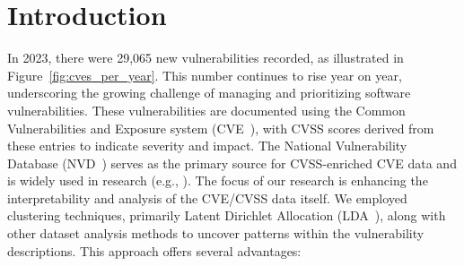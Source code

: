 \section{Introduction}

In 2023, there were 29,065 new vulnerabilities recorded, as illustrated in
Figure~\ref{fig:cves_per_year}. This number continues to rise year on year, underscoring the growing
challenge of managing and prioritizing software vulnerabilities. These vulnerabilities are
documented using the Common Vulnerabilities and Exposure system (CVE~\cite{CVE}), with CVSS scores
derived from these entries to indicate severity and impact. The National Vulnerability Database
(NVD~\cite{NVD}) serves as the primary source for CVSS-enriched CVE data and is widely used in
research (e.g., \cite{costa, nvd_example1, nvd_example2}). The focus of our research is enhancing the interpretability and analysis of the CVE/CVSS data itself. We employed clustering techniques, primarily Latent Dirichlet Allocation (LDA~\cite{lda_origin}), along with other dataset analysis methods to uncover patterns within the vulnerability descriptions. This approach offers several advantages:


